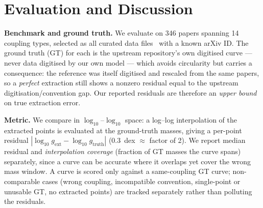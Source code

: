 \documentclass{article}
\begin{document}
\section{Evaluation and Discussion}
\label{sec:eval}

\textbf{Benchmark and ground truth.}
We evaluate on 346 papers spanning 14 coupling types, selected as all curated data files~\cite{axionlimits} with a known arXiv ID. The ground truth (GT) for each is the upstream repository's own digitised curve --- never data digitised by our own model --- which avoids circularity but carries a consequence: the reference was itself digitised and rescaled from the same papers, so a \emph{perfect} extraction still shows a nonzero residual equal to the upstream digitisation/convention gap. Our reported residuals are therefore an \emph{upper bound} on true extraction error.

\textbf{Metric.}
We compare in $\log_{10}$--$\log_{10}$ space: a log--log interpolation of the extracted points is evaluated at the ground-truth masses, giving a per-point residual $|\log_{10} g_\text{ext} - \log_{10} g_\text{truth}|$ (0.3~dex $\approx$ factor of 2). We report median residual and \emph{interpolation coverage} (fraction of GT masses the curve spans) separately, since a curve can be accurate where it overlaps yet cover the wrong mass window. A curve is scored only against a same-coupling GT curve; non-comparable cases (wrong coupling, incompatible convention, single-point or unusable GT, no extracted points) are tracked separately rather than polluting the residuals.
\end{document}
